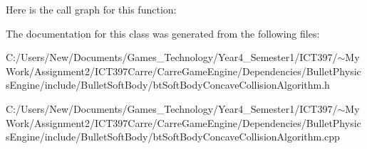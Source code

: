 Here is the call graph for this function:

The documentation for this class was generated from the following files:\begin{CompactItemize}
\item 
C:/Users/New/Documents/Games\_\-Technology/Year4\_\-Semester1/ICT397/$\sim$My Work/Assignment2/ICT397Carre/CarreGameEngine/Dependencies/BulletPhysicsEngine/include/BulletSoftBody/btSoftBodyConcaveCollisionAlgorithm.h\item 
C:/Users/New/Documents/Games\_\-Technology/Year4\_\-Semester1/ICT397/$\sim$My Work/Assignment2/ICT397Carre/CarreGameEngine/Dependencies/BulletPhysicsEngine/include/BulletSoftBody/btSoftBodyConcaveCollisionAlgorithm.cpp\end{CompactItemize}
